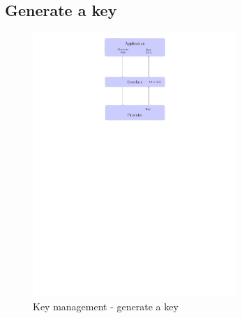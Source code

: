 \subsection*{Generate a key}
\begin{figure}[!ht]
\centering
\includegraphics[trim=12cm 18.5cm 9.5cm 0cm,
height=10cm]{figures/key_manag_gen_key.pdf}
\caption{Key management - generate a key\newline}
\label{fig:gci_key_mng_gen}
\end{figure}
\newpage
